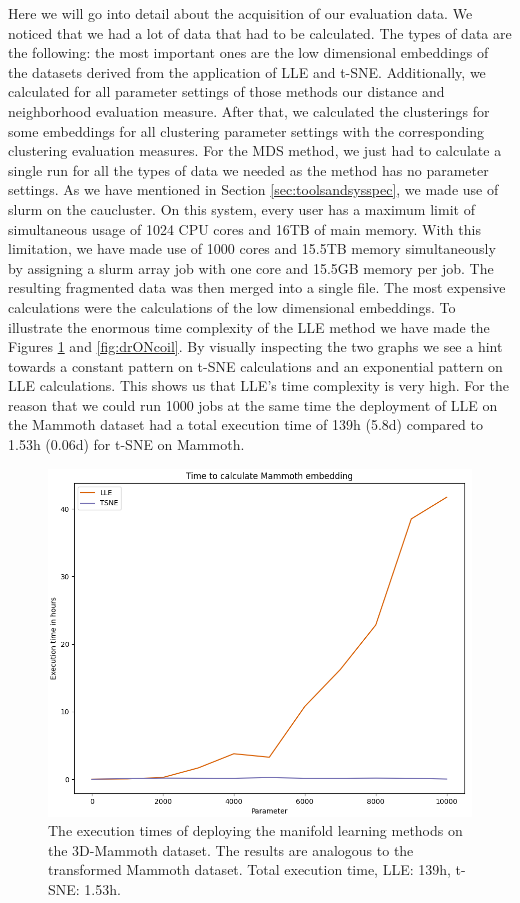 Here we will go into detail about the acquisition of our evaluation data. We noticed that we had a lot of data that had to be calculated. The types of data are the following: the most important ones are the low dimensional embeddings of the datasets derived from the application of LLE and t-SNE. Additionally, we calculated for all parameter settings of those methods our distance and neighborhood evaluation measure. After that, we calculated the clusterings for some embeddings for all clustering parameter settings with the corresponding clustering evaluation measures. For the MDS method, we just had to calculate a single run for all the types of data we needed as the method has no parameter settings.
As we have mentioned in Section \ref{sec:toolsandsysspec}, we made use of slurm on the caucluster. On this system, every user has a maximum limit of simultaneous usage of 1024 CPU cores and 16TB of main memory. With this limitation, we have made use of 1000 cores and 15.5TB memory simultaneously by assigning a slurm array job with one core and 15.5GB memory per job. The resulting fragmented data was then merged into a single file.
The most expensive calculations were the calculations of the low dimensional embeddings. To illustrate the enormous time complexity of the LLE method we have made the Figures \ref{fig:drONmamm} and \ref{fig:drONcoil}. By visually inspecting the two graphs we see a hint towards a constant pattern on t-SNE calculations and an exponential pattern on LLE calculations. This shows us that LLE's time complexity is very high.
For the reason that we could run 1000 jobs at the same time the deployment of LLE on the Mammoth dataset had a total execution time of 139h (5.8d) compared to 1.53h (0.06d) for t-SNE on Mammoth.
\begin{figure}[!]
	\centering
	\includegraphics[width=0.80\columnwidth]{images/drONmamm.png}
	\caption[DR on 3D-Mammoth]{The execution times of deploying the manifold learning methods on the 3D-Mammoth dataset. The results are analogous to the transformed Mammoth dataset. Total execution time, \textcolor{lle}{LLE: 139h}, \textcolor{tsne}{t-SNE: 1.53h}.}
    \label{fig:drONmamm}
\end{figure}
